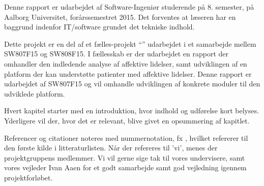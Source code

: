 Denne rapport er udarbejdet af Software-Ingeniør studerende på 8. semester, på Aalborg Universitet, forårssemestret 2015.
Det forventes at læseren har en baggrund indenfor IT/software grundet det tekniske indhold.

Dette projekt er en del af et fælles-projekt ``''\cite{faelles} udarbejdet i et samarbejde mellem SW807F15 og SW808F15.
I fællesskab er der udarbejdet en rapport der omhandler den indledende analyse af affektive lidelser, samt udviklingen af en platform der kan understøtte patienter med affektive lidelser.
Denne rapport er udarbejdet af SW807F15 og vil omhandle udviklingen af konkrete moduler til den udviklede platform.

Hvert kapitel starter med en introduktion, hvor indhold og udførelse kort belyses.
Yderligere vil der, hvor det er relevant, blive givet en opsummering af kapitlet.

Referencer og citationer noteres med nummernotation, fx \cite{faelles}, hvilket refererer til den første kilde i litteraturlisten.
Når der refereres til 'vi', menes der projektgruppens medlemmer.
\newline
\newline
Vi vil gerne sige tak til vores undervisere, samt vores vejleder Ivan Aaen for et godt samarbejde samt god vejledning igennem projektforløbet.